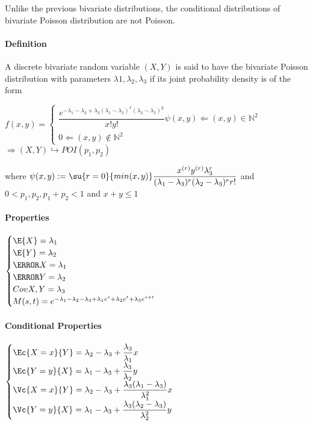 Unlike the previous bivariate distributions, the conditional distributions of bivariate Poisson distribution are not Poisson.
\paragraph{Definition}
A discrete bivariate random variable $(X, Y )$ is said to have
the bivariate Poisson distribution with parameters $\lambda{1},\lambda_{2},\lambda_{3}$ if its joint probability density is of the
form
\begin{center}
	$f(x,y)=
	\begin{cases}	
		\dfrac{e^{-\lambda_{1}-\lambda_{ 2}+\lambda_{3}(\lambda_{1}-\lambda_{3})^{x}(\lambda_{2}-\lambda_{3})^{y}}}{x!y!}\psi(x,y)\Leftarrow (x,y)\in\mathbb{N}^{2}\\
		0\Leftarrow (x,y)\not\in\mathbb{N}^{2} 
	\end{cases}$	
	$\Rightarrow \left( X,Y \right)\hookrightarrow POI(p_{1},p_{2})
	$
\end{center}
where $\psi(x,y):=\su{ {r=0}}{ {min(x,y)}}\dfrac{x^{(r)}y^{(r)}\lambda_{3}^{r}}{(\lambda_{1}-\lambda_{3})^{r}(\lambda_{2}-\lambda_{3})^{r}r!}$ and $0<p_{1},p_{2}, p_{1}+p_{2}<1$ and $x+y\leq 1$
\paragraph{Properties}
\begin{center}
	$
	\begin{cases}
		\E{X}=\lambda_{1}\\
		\E{Y}=\lambda_{2}\\
		\V{X}=\lambda_{1}\\
		\V{Y}=\lambda_{2}\\
		Cov{X,Y}=\lambda_{3}\\
		M(s,t)=e^{-\lambda_{1}-\lambda_{2}-\lambda_{3}+\lambda_{1}e^{s}+\lambda_{2}e^{t}+\lambda_{3}e^{s+t}}
	\end{cases}
	$
\end{center}
\paragraph{Conditional Properties}
\begin{center}
	$
	\begin{cases}
		\Ec{X=x}{Y}=\lambda_{2}-\lambda_{3}+\dfrac{\lambda_{3}}{\lambda_{1}}x\\
		\Ec{Y=y}{X}=\lambda_{1}-\lambda_{3}+\dfrac{\lambda_{3}}{\lambda_{2}}y\\
		\Vc{X=x}{Y}=\lambda_{2}-\lambda_{3}+\dfrac{\lambda_{3}(\lambda_{1}-\lambda_{3})}{\lambda_{1}^{2}}x\\
		\Vc{Y=y}{X}=\lambda_{1}-\lambda_{3}+\dfrac{\lambda_{3}(\lambda_{2}-\lambda_{3})}{\lambda_{2}^{2}}y
	\end{cases}
	$
\end{center}
